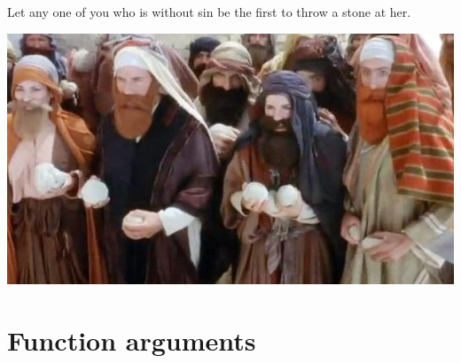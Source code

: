\documentclass{beamer}
\begin{document}
\begin{frame}
\begin{center}
    \structure{\insertsection}
\end{center}
Let any one of you who is without sin be the first to throw a stone at her.
\end{frame}
\begin{frame}
    \begin{center}
        \includegraphics[width=1\textwidth]{images/stone1.jpg}
    \end{center}
\end{frame}


\section{Function arguments}
\end{document}
